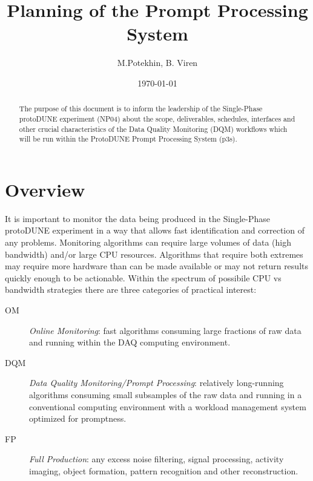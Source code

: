 \documentclass[pdftex,12pt,letter]{article}
\title{Planning of the \pd Prompt Processing System}
\date{\today}
\author{M.Potekhin, B. Viren}
\newcommand{\pd}{protoDUNE\xspace}
\begin{document}

\maketitle

\begin{abstract}
  \noindent The purpose of this document is to inform the leadership
  of the Single-Phase \pd experiment (NP04) about the scope,
  deliverables, schedules, interfaces and other crucial
  characteristics of the Data Quality Monitoring (DQM) workflows which will be
  run within the ProtoDUNE Prompt Processing System (p3s).
\end{abstract}

\tableofcontents

\pagebreak

\section{Overview}
It is important to monitor the data being produced in the Single-Phase
\pd experiment in a way that allows fast identification and correction
of any problems.  Monitoring algorithms can require large volumes of
data (high bandwidth) and/or large CPU resources.  Algorithms that require both extremes
may require more hardware than can be made available or may not return results quickly
enough to be actionable.
Within the spectrum of possibile CPU vs bandwidth strategies there are three categories
of practical interest:

\begin{description}

\item[OM] \textit{Online Monitoring}: fast algorithms consuming large fractions of raw data and running
within the DAQ computing environment.

\item[DQM] \textit{Data Quality Monitoring/Prompt Processing}: relatively long-running algorithms consuming
small subsamples of the raw data and running in a conventional computing environment with a workload management system optimized for promptness.

\item[FP] \textit{Full Production}: any excess noise filtering, signal processing, activity imaging, object formation, pattern recognition and other reconstruction.

\end{description}
\end{document}
